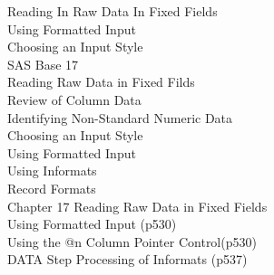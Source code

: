 Reading In Raw Data In Fixed Fields\\
Using Formatted Input\\
Choosing an Input Style\\
SAS Base 17\\
Reading Raw Data in Fixed Filds\\
Review of Column Data\\
Identifying Non-Standard Numeric Data\\
Choosing an Input Style\\
Using Formatted Input\\
Using Informats\\
Record Formats\\
Chapter 17 Reading Raw Data in Fixed Fields\\
Using Formatted Input (p530)\\
Using the @n Column Pointer Control(p530)\\
DATA Step Processing of Informats (p537)\\
